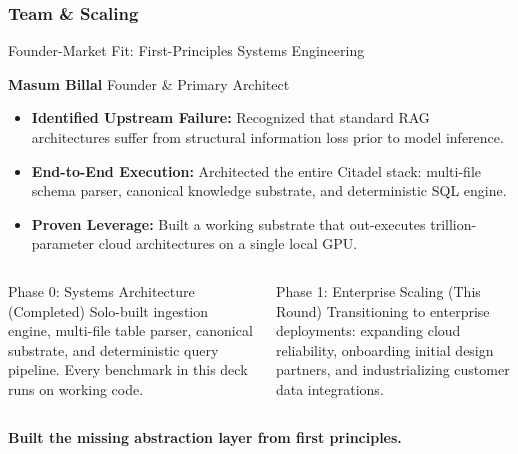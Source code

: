 \documentclass[aspectratio=169,11pt]{beamer}
\begin{document}
	\begin{frame}
		\frametitle{Team \& Scaling}

		\begin{block}{\scriptsize Founder-Market Fit: First-Principles Systems Engineering}
			{\tiny
				\textbf{Masum Billal} \textemdash{} Founder \& Primary Architect
				\begin{itemize}
					\item \textbf{Identified Upstream Failure:} Recognized that standard RAG architectures suffer from structural information loss prior to model inference.
					\item \textbf{End-to-End Execution:} Architected the entire Citadel stack: multi-file schema parser, canonical knowledge substrate, and deterministic SQL engine.
					\item \textbf{Proven Leverage:} Built a working substrate that out-executes trillion-parameter cloud architectures on a single local GPU.
				\end{itemize}
			}
		\end{block}

		\vspace{0.1cm}

		\begin{columns}[T]
			\begin{block}{\scriptsize Phase 0: Systems Architecture (Completed)}
				{\tiny
					Solo-built ingestion engine, multi-file table parser, canonical substrate, and deterministic query pipeline. Every benchmark in this deck runs on working code.
				}
			\end{block}

			\begin{block}{\scriptsize Phase 1: Enterprise Scaling (This Round)}
				{\tiny
					Transitioning to enterprise deployments: expanding cloud reliability, onboarding initial design partners, and industrializing customer data integrations.
				}
			\end{block}
		\end{columns}

		\vfill
		\centering
		{\tiny\color{CitadelHighlight}\bfseries Built the missing abstraction layer from first principles.}
	\end{frame}
\end{document}
